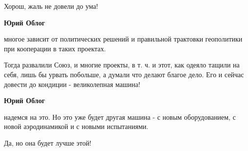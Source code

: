 
 
 
 
 

Хорош, жаль не довели до ума!

\textbf{Юрий Облог} 

многое зависит от политических решений и правильной трактовки геополитики при
кооперации в таких проектах.


Тогда развалили Союз, и многие проекты, в т. ч. и этот, как одеяло тащили на
себя, лишь бы урвать побольше, а думали что делают благое дело. Его и сейчас
довести до кондиции - великолепная машина!

\textbf{Юрий Облог} 

надемся на это. Но это уже будет другая машина - с новым оборудованием, с новой
аэродинамикой и с новыми испытаниями.

Да, но она будет лучше этой!
